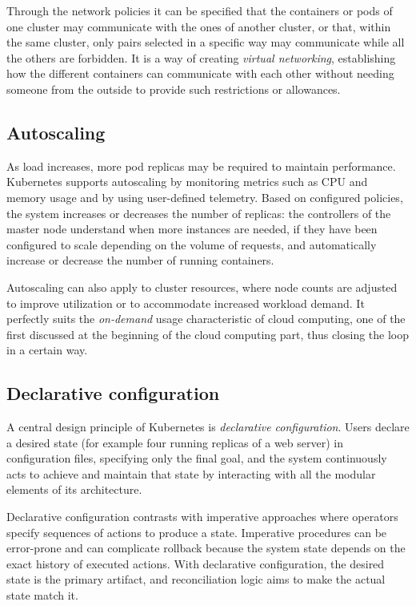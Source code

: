 Through the network policies it can be specified that the containers or pods of one cluster may communicate with the ones of another cluster, or that, within the same cluster, only pairs selected in a specific way may communicate while all the others are forbidden. It is a way of creating \emph{virtual networking}, establishing how the different containers can communicate with each other without needing someone from the outside to provide such restrictions or allowances.

\subsection{Autoscaling}

As load increases, more pod replicas may be required to maintain performance. Kubernetes supports autoscaling by monitoring metrics such as CPU and memory usage and by using user-defined telemetry. Based on configured policies, the system increases or decreases the number of replicas: the controllers of the master node understand when more instances are needed, if they have been configured to scale depending on the volume of requests, and automatically increase or decrease the number of running containers.

Autoscaling can also apply to cluster resources, where node counts are adjusted to improve utilization or to accommodate increased workload demand. It perfectly suits the \emph{on-demand} usage characteristic of cloud computing, one of the first discussed at the beginning of the cloud computing part, thus closing the loop in a certain way.

\subsection{Declarative configuration}

A central design principle of Kubernetes is \emph{declarative configuration}. Users declare a desired state (for example four running replicas of a web server) in configuration files, specifying only the final goal, and the system continuously acts to achieve and maintain that state by interacting with all the modular elements of its architecture.

Declarative configuration contrasts with imperative approaches where operators specify sequences of actions to produce a state. Imperative procedures can be error-prone and can complicate rollback because the system state depends on the exact history of executed actions. With declarative configuration, the desired state is the primary artifact, and reconciliation logic aims to make the actual state match it.

